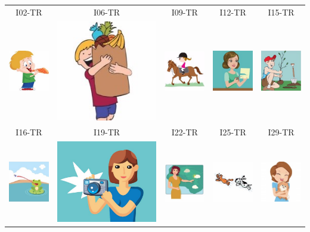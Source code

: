 \documentclass[12pt,notitlepage]{article}
\begin{document}
\begin{center}
\begin{tabular}{|c||c||c||c||c|}
\hline
I02-TR & I06-TR & I09-TR & I12-TR & I15-TR \\
\includegraphics[width=0.13\columnwidth]{square/I02.jpg} &  \includegraphics[width=0.13\columnwidth]{square/I06.jpg} & \includegraphics[width=0.13\columnwidth]{square/I09.jpg} & \includegraphics[width=0.13\columnwidth]{square/I12.jpg} &  \includegraphics[width=0.13\columnwidth]{square/I15.jpg} \\
\hline
\hline
I16-TR & I19-TR & I22-TR & I25-TR & I29-TR \\
\includegraphics[width=0.13\columnwidth]{square/I16.jpg} & \includegraphics[width=0.13\columnwidth]{figures/I19.jpg} &  \includegraphics[width=0.13\columnwidth]{square/I22.jpg} &  \includegraphics[width=0.13\columnwidth]{square/I25.jpg} & \includegraphics[width=0.13\columnwidth]{square/I29.jpg} \\
\hline
\end{tabular}
\medskip


\end{center}
\end{document}
